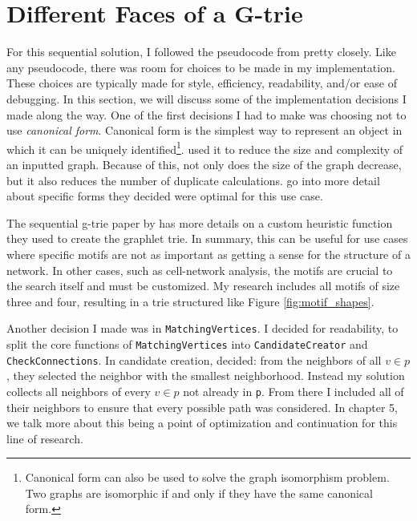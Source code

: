 \documentclass[12pt,twoside]{reedthesis}
\begin{document}
\section{Different Faces of a G-trie}
For this sequential solution, I followed the pseudocode from \citeauthor{g_tries} \cite{g_tries} pretty closely. Like any pseudocode, there was room for choices to be made in my implementation. These choices are typically made for style, efficiency, readability, and/or ease of debugging. In this section, we will discuss some of the implementation decisions I made along the way. One of the first decisions I had to make was choosing not to use \textit{canonical form}.
Canonical form is the simplest way to represent an object in which it can be uniquely identified\footnote{Canonical form can also be used to solve the graph isomorphism problem. Two graphs are isomorphic if and only if they have the same canonical form.}. \citeauthor{g_tries} used it to reduce the size and complexity of an inputted graph. Because of this, not only does the size of the graph decrease, but it also reduces the number of duplicate calculations. \citeauthor{g_tries} \cite{g_tries}  go into more detail about specific forms they decided were optimal for this use case.

The sequential g-trie paper  by \citeauthor{g_tries} \cite{g_tries} has more details on a custom heuristic function they used to create the graphlet trie. In summary, this can be useful for use cases where specific motifs are not as important as getting a sense for the structure of a network. In other cases, such as cell-network analysis, the motifs are crucial to the search itself and must be customized. My research includes all motifs of size three and four, resulting in a trie structured like Figure \ref{fig:motif_shapes}.

Another decision I made was in \texttt{MatchingVertices}. I decided for readability, to split the core functions of \texttt{MatchingVertices} into \texttt{CandidateCreator} and \texttt{CheckConnections}. In candidate creation, \citeauthor{g_tries} \cite{g_tries} decided: from the neighbors of all $v \in p$, they selected the neighbor with the smallest neighborhood. Instead my solution collects all neighbors of every $v \in p$ not already in \texttt{p}. From there I included all of their neighbors to ensure that every possible path was considered. In chapter 5, we talk more about this being a point of optimization and continuation for this line of research.
\end{document}
